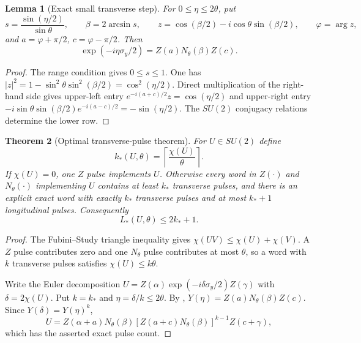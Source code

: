 \documentclass[11pt]{article}
\newtheorem{theorem}{Theorem}[section]
\newtheorem{lemma}[theorem]{Lemma}
\theoremstyle{definition}
\theoremstyle{remark}
\begin{document}
\begin{lemma}[Exact small transverse step]
\label{lem:small-transverse-step-master}
For $0\le\eta\le2\theta$, put
\[
  s=\frac{\sin(\eta/2)}{\sin\theta},
  \qquad
  \beta=2\arcsin s,
  \qquad
  z=\cos(\beta/2)-i\cos\theta\sin(\beta/2),
  \qquad
  \varphi=\arg z,
\]
and $a=\varphi+\pi/2$, $c=\varphi-\pi/2$.  Then
\begin{equation}
  \boxed{
  \exp(-i\eta\sigma_y/2)
  =Z(a)N_\theta(\beta)Z(c).}
  \label{eq:small-transverse-step-master}
\end{equation}
\end{lemma}

\begin{proof}
The range condition gives $0\le s\le1$.  One has
$|z|^2=1-\sin^2\theta\sin^2(\beta/2)=\cos^2(\eta/2)$.  Direct multiplication of
the right-hand side gives upper-left entry
$e^{-i(a+c)/2}z=\cos(\eta/2)$ and upper-right entry
$-i\sin\theta\sin(\beta/2)e^{-i(a-c)/2}=-\sin(\eta/2)$.
The $SU(2)$ conjugacy relations determine the lower row.
\end{proof}

\begin{theorem}[Optimal transverse-pulse theorem]
\label{thm:optimal-transverse-pulse-master}
For $U\in SU(2)$ define
\begin{equation}
  \boxed{k_*(U,\theta)=\left\lceil\frac{\chi(U)}{\theta}\right\rceil.}
  \label{eq:optimal-transverse-count-master}
\end{equation}
If $\chi(U)=0$, one $Z$ pulse implements $U$.  Otherwise every word in
$Z(\cdot)$ and $N_\theta(\cdot)$ implementing $U$ contains at least $k_*$
transverse pulses, and there is an explicit exact word with exactly $k_*$
transverse pulses and at most $k_*+1$ longitudinal pulses.  Consequently
\begin{equation}
  \boxed{L_*(U,\theta)\le2k_*+1.}
  \label{eq:optimal-total-pulses-master}
\end{equation}
\end{theorem}

\begin{proof}
The Fubini--Study triangle inequality gives
$\chi(UV)\le\chi(U)+\chi(V)$.  A $Z$ pulse contributes zero and one
$N_\theta$ pulse contributes at most $\theta$, so a word with $k$ transverse
pulses satisfies $\chi(U)\le k\theta$.

Write the Euler decomposition
$U=Z(\alpha)\exp(-i\delta\sigma_y/2)Z(\gamma)$ with
$\delta=2\chi(U)$.  Put $k=k_*$ and $\eta=\delta/k\le2\theta$.
By ,
$Y(\eta)=Z(a)N_\theta(\beta)Z(c)$.  Since
$Y(\delta)=Y(\eta)^k$,
\[
 U=Z(\alpha+a)N_\theta(\beta)
   [Z(a+c)N_\theta(\beta)]^{k-1}Z(c+\gamma),
\]
which has the asserted exact pulse count.
\end{proof}
\end{document}

